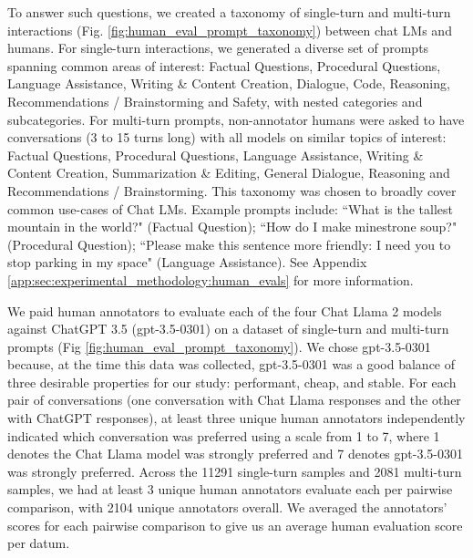 To answer such questions, we created a taxonomy of single-turn and multi-turn interactions (Fig. \ref{fig:human_eval_prompt_taxonomy}) between chat LMs and humans. For single-turn interactions, we generated a diverse set of prompts spanning common areas of interest: Factual Questions, Procedural Questions, Language Assistance, Writing \& Content Creation, Dialogue, Code, Reasoning, Recommendations / Brainstorming and Safety, with nested categories and subcategories. 
For multi-turn prompts, non-annotator humans were asked to have conversations (3 to 15 turns long) with all models on similar topics of interest: Factual Questions, Procedural Questions, Language Assistance, Writing \& Content Creation, Summarization \& Editing, General Dialogue, Reasoning and Recommendations / Brainstorming. This taxonomy was chosen to broadly cover common use-cases of Chat LMs.
Example prompts include: ``What is the tallest mountain in the world?" (Factual Question); ``How do I make minestrone soup?" (Procedural Question); ``Please make this sentence more friendly: I need you to stop parking in my space" (Language Assistance). 
See Appendix \ref{app:sec:experimental_methodology:human_evals} for more information.

We paid human annotators to evaluate each of the four Chat Llama 2 models against ChatGPT 3.5 \citep{ouyang2022training} (gpt-3.5-0301) on a dataset of single-turn and multi-turn prompts (Fig \ref{fig:human_eval_prompt_taxonomy}). We chose gpt-3.5-0301 because, at the time this data was collected, gpt-3.5-0301 was a good balance of three desirable properties for our study: performant, cheap, and stable.
For each pair of conversations (one conversation with Chat Llama responses and the other with ChatGPT responses), at least three unique human annotators independently indicated which conversation was preferred using a \citet{likert1932technique} scale from 1 to 7, where 1 denotes the Chat Llama model was strongly preferred and 7 denotes gpt-3.5-0301 was strongly preferred.
Across the 11291 single-turn samples and 2081 multi-turn samples, we had at least 3 unique human annotators evaluate each per pairwise comparison, with 2104 unique annotators overall. 
We averaged the annotators' scores for each pairwise comparison to give us an average human evaluation score per datum.



